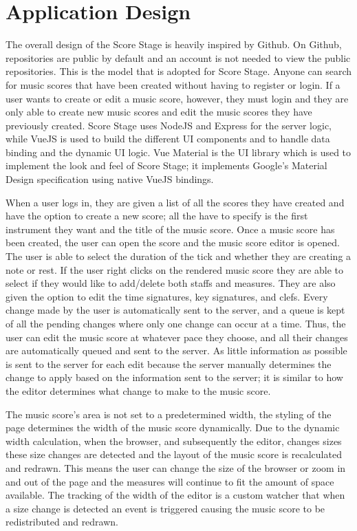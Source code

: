 \documentclass[letterpaper,12pt]{article}
\begin{document}
\section{Application Design}

The overall design of the Score Stage is heavily inspired by Github. On Github, repositories are public by default and
an account is not needed to view the public repositories. This is the model that is adopted for Score Stage. Anyone can
search for music scores that have been created without having to register or login. If a user wants to create or edit
a music score, however, they must login and they are only able to create new music scores and edit the music scores they
have previously created. Score Stage uses NodeJS and Express for the server logic, while VueJS is used to build the
different UI components and to handle data binding and the dynamic UI logic. Vue Material is the UI library which is
used to implement the look and feel of Score Stage; it implements Google's Material Design specification using native
VueJS bindings.

When a user logs in, they are given a list of all the scores they have created and have the option to create a new
score; all the have to specify is the first instrument they want and the title of the music score. Once a music score
has been created, the user can open the score and the music score editor is opened. The user is able to select the
duration of the tick and whether they are creating a note or rest. If the user right clicks on the rendered music score
they are able to select if they would like to add/delete both staffs and measures. They are also given the option to
edit the time signatures, key signatures, and clefs. Every change made by the user is automatically sent to the server,
and a queue is kept of all the pending changes where only one change can occur at a time. Thus, the user can edit the
music score at whatever pace they choose, and all their changes are automatically queued and sent to the server. As
little information as possible is sent to the server for each edit because the server manually determines the change to
apply based on the information sent to the server; it is similar to how the editor determines what change to make to the
music score.

The music score's area is not set to a predetermined width, the styling of the page determines the width of the music
score dynamically. Due to the dynamic width calculation, when the browser, and subsequently the editor, changes sizes
these size changes are detected and the layout of the music score is recalculated and redrawn. This means the user can
change the size of the browser or zoom in and out of the page and the measures will continue to fit the amount of space
available. The tracking of the width of the editor is a custom watcher that when a size change is detected an event is
triggered causing the music score to be redistributed and redrawn.
\end{document}
